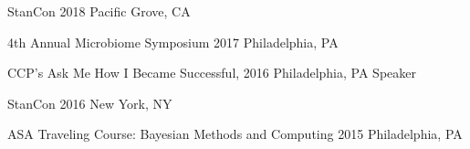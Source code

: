 

\begin{cvconfs}

  \cvconf
    {StanCon} %
    {2018} %
    {Pacific Grove, CA} %
    {}

  \cvconf
    {4th Annual Microbiome Symposium} %
    {2017} %
    {Philadelphia, PA} %
    {}
    
  \cvconf
	{CCP's Ask Me How I Became Successful,}
	{2016}
	{Philadelphia, PA}
	{Speaker}

  \cvconf
    {StanCon} %
    {2016} %
    {New York, NY} %
    {}
    
  \cvconf
    {ASA Traveling Course: Bayesian Methods and Computing} %
    {2015} %
    {Philadelphia, PA} %
    {}
\end{cvconfs}

